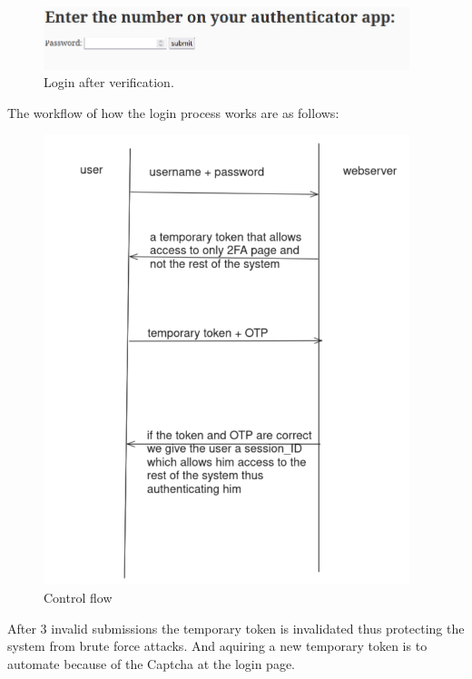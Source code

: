 \documentclass[a4paper]{article}
\begin{document}
\begin{figure}[H]
    \begin{center}
        \includegraphics[width=0.95\textwidth]{login.png}
    \end{center}
    \caption{Login after verification.}\label{fig:}
\end{figure}

The workflow of how the login process works are as follows:

\begin{figure}[H]
    \begin{center}
        \includegraphics[width=0.95\textwidth]{control_flow.png}
    \end{center}
    \caption{Control flow}\label{fig:}
\end{figure}

After 3 invalid submissions the temporary token is invalidated thus protecting the system from brute force attacks. And aquiring a new temporary token is to automate because of the Captcha at the login page.
\end{document}
